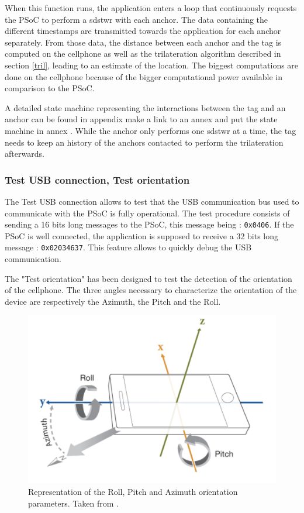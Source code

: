 When this function runs, the application enters a loop that continuously requests the PSoC to perform a \gls{sdstwr} with each anchor. The data containing the different timestamps are transmitted towards the application for each anchor separately. From those data, the distance between each anchor and the tag is computed on the cellphone as well as the trilateration algorithm described in section \ref{tril}, leading to an estimate of the location. The biggest computations are done on the cellphone because of the bigger computational power available in comparison to the PSoC.
\vspace{2mm}

A detailed state machine representing the interactions between the tag and an anchor can be found in appendix \color{red} make a link to an annex and put the state machine in annex \color{black}  \cite{hannotier2019indoor}. While the anchor only performs one \gls{sdstwr} at a time, the tag needs to keep an history of the anchors contacted to perform the trilateration afterwards.

\subsubsection{Test USB connection, Test orientation}

The Test USB connection allows to test that the USB communication bus used to communicate with the PSoC is fully operational. The test procedure consists of sending a 16 bits long messages to the PSoC, this message being : \texttt{0x0406}. If the PSoC is well connected, the application is supposed to receive a 32 bits long message : \texttt{0x02034637}. This feature allows to quickly debug the USB communication.
\vspace{2mm}

The "Test orientation" has been designed to test the detection of the orientation of the cellphone. The three angles necessary to characterize the orientation of the device are respectively the Azimuth, the Pitch and the Roll.

\begin{figure}[H]
\centering
\includegraphics[width=.6\linewidth]{Images/angles_gsm.png}
\caption{Representation of the Roll, Pitch and Azimuth orientation parameters. Taken from \cite{mathworks}.}
\end{figure}

